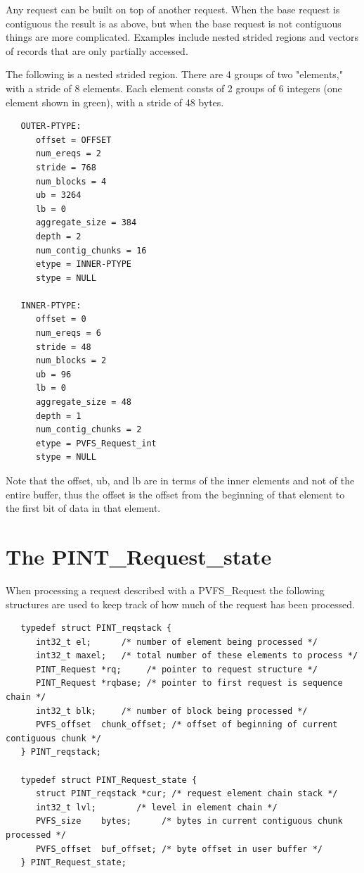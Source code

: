 \documentclass[12pt]{article} %
\begin{document}
Any request can be built on top of another request.  When the base
request is
contiguous the result is as above, but when the base request is not
contiguous things are more complicated.  Examples include nested
strided regions and vectors of records that are only partially
accessed.

The following is a nested strided region.  There are 4 groups of
two "elements," with a stride of 8 elements.  Each element consts
of 2 groups of 6 integers (one element shown in green), with a stride
of 48 bytes.

\begin{verbatim}
   OUTER-PTYPE:
      offset = OFFSET
      num_ereqs = 2
      stride = 768
      num_blocks = 4
      ub = 3264
      lb = 0
      aggregate_size = 384
      depth = 2
      num_contig_chunks = 16
      etype = INNER-PTYPE
      stype = NULL

   INNER-PTYPE:
      offset = 0
      num_ereqs = 6
      stride = 48
      num_blocks = 2
      ub = 96
      lb = 0
      aggregate_size = 48
      depth = 1
      num_contig_chunks = 2
      etype = PVFS_Request_int
      stype = NULL
\end{verbatim}

Note that the offset, ub, and lb are in terms of the inner elements
and not of the entire buffer, thus the offset is the offset from the
beginning of that element to the first bit of data in that element.

\section{The PINT\_Request\_state}

When processing a request described with a PVFS\_Request the following
structures are used to keep track of how much of the request has been
processed.

\begin{verbatim}
   typedef struct PINT_reqstack {
      int32_t el;      /* number of element being processed */
      int32_t maxel;   /* total number of these elements to process */
      PINT_Request *rq;     /* pointer to request structure */
      PINT_Request *rqbase; /* pointer to first request is sequence chain */
      int32_t blk;     /* number of block being processed */
      PVFS_offset  chunk_offset; /* offset of beginning of current contiguous chunk */
   } PINT_reqstack;

   typedef struct PINT_Request_state {
      struct PINT_reqstack *cur; /* request element chain stack */
      int32_t lvl;        /* level in element chain */
      PVFS_size    bytes;      /* bytes in current contiguous chunk processed */
      PVFS_offset  buf_offset; /* byte offset in user buffer */
   } PINT_Request_state;
\end{verbatim}
\end{document}
